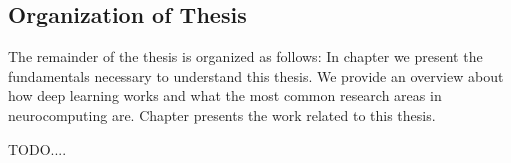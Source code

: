 



\subsection{Organization of Thesis}
The remainder of the thesis is organized as follows: In chapter  we present the fundamentals necessary to understand this thesis. We provide an overview about how deep learning works and what the most common research areas in neurocomputing are. Chapter  presents the work related to this thesis.

TODO....



